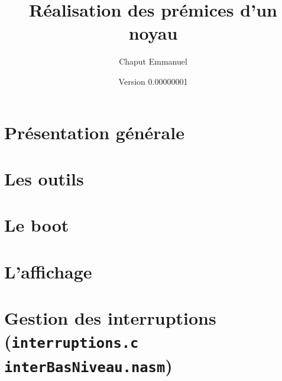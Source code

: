 \documentclass{book}
\title{Réalisation des prémices d'un noyau}
\author{Chaput Emmanuel}
\date{Version 0.00000001}
\begin{document}
\lstset{language=C,%
        basicstyle=\ttfamily,%
        keywordstyle=\bfseries,%
        ndkeywordstyle=\bfseries \underbar ,%
        identifierstyle=\em,%
        extendedchars}

\maketitle
\tableofcontents

\chapter{Présentation générale}


%
\chapter{Les outils}


\chapter{Le boot}


\chapter{L'affichage}


\chapter{Gestion des interruptions ({\tt interruptions.c interBasNiveau.nasm})}

\end{document}
